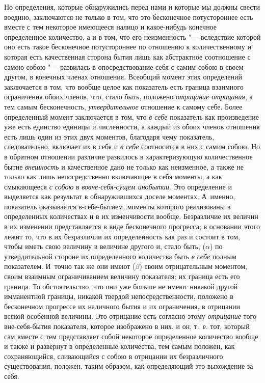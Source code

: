 Но определения, которые обнаружились перед нами и которые мы должны свести
воедино, заключаются не только в том, что это бесконечное потустороннее
есть вместе с тем некоторое имеющееся налицо и какое-нибудь конечное
определенное количество, а и в том, что его неизменность "--- вследствие
которой оно есть такое бесконечное потустороннее по отношению к
количественному и которая есть качественная сторона бытия лишь как
абстрактное соотношение с самою собою "--- развилась в опосредствование себя с
самим собою в своем другом, в конечных членах отношения. Всеобщий момент
этих определений заключается в том, что вообще целое как показатель есть
граница взаимного ограничения обоих членов, что, стало быть, положено
{\em отрицание отрицания}, а тем самым бесконечность,
{\em утвердительное} отношение к самому себе. Более
определенный момент заключается в том, что {\em в себе}
показатель как произведение уже есть единство единицы и численности, а
каждый из обоих членов отношения есть лишь один из этих двух моментов,
благодаря чему показатель, следовательно, включает их в себя и
{\em в себе} соотносится в них с самим собою. Но в
обратном отношении различие развилось в характеризующую количественное
бытие {\em внешность} и качественное дано не только как
неизменное, а также не только как лишь непосредственно включающее в себя
моменты, а как смыкающееся {\em с собою} в {\em вовне-себя-сущем
инобытии}. Это определение и выделяется как результат в
обнаружившихся доселе моментах. А~именно, показатель оказывается
в-себе-бытием, моменты которого реализованы в определенных количествах и в
их изменчивости вообще. Безразличие их величин в их изменении
представляется в виде бесконечного прогресса; в основании этого лежит то,
что в их безразличии их определенность как раз и состоит в том, чтобы иметь
свою величину в величине другого и, стало быть,
($\alpha $) по утвердительной стороне их
определенного количества быть {\em в себе} полным
показателем. И~точно так же они имеют ($\beta $) своим
отрицательным моментом, своим взаимным ограничиванием величину показателя;
их граница есть его граница. То обстоятельство, что они уже больше не имеют
никакой другой имманентной границы, никакой
твердой непосредственности, положено в бесконечном прогрессе их наличного
бытия и их ограничения, в отрицании всякой особенной величины. Это
отрицание есть согласно этому {\em отрицание} того
вне-себя-бытия показателя, которое изображено в них, и он, т.~е. тот,
который сам вместе с тем представляет собой некоторое определенное
количество вообще и также и развернут в определенные количества, тем самым
положен, как сохраняющийся, сливающийся с собою в отрицании их
безразличного существования, положен, таким образом, как определяющий это
выхождение за себя.

